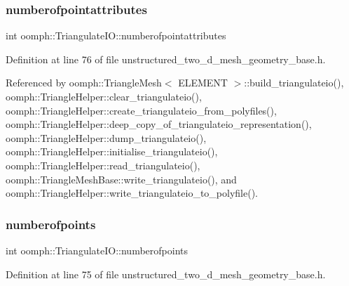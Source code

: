 \mbox{\label{structoomph_1_1TriangulateIO_acfe3391dd2b35a7f04de5935c112678c}} 
\subsubsection{\texorpdfstring{numberofpointattributes}{numberofpointattributes}}
{\footnotesize\ttfamily int oomph\+::\+Triangulate\+I\+O\+::numberofpointattributes}



Definition at line 76 of file unstructured\+\_\+two\+\_\+d\+\_\+mesh\+\_\+geometry\+\_\+base.\+h.



Referenced by oomph\+::\+Triangle\+Mesh$<$ E\+L\+E\+M\+E\+N\+T $>$\+::build\+\_\+triangulateio(), oomph\+::\+Triangle\+Helper\+::clear\+\_\+triangulateio(), oomph\+::\+Triangle\+Helper\+::create\+\_\+triangulateio\+\_\+from\+\_\+polyfiles(), oomph\+::\+Triangle\+Helper\+::deep\+\_\+copy\+\_\+of\+\_\+triangulateio\+\_\+representation(), oomph\+::\+Triangle\+Helper\+::dump\+\_\+triangulateio(), oomph\+::\+Triangle\+Helper\+::initialise\+\_\+triangulateio(), oomph\+::\+Triangle\+Helper\+::read\+\_\+triangulateio(), oomph\+::\+Triangle\+Mesh\+Base\+::write\+\_\+triangulateio(), and oomph\+::\+Triangle\+Helper\+::write\+\_\+triangulateio\+\_\+to\+\_\+polyfile().

\mbox{\label{structoomph_1_1TriangulateIO_a56b30cea17878e957906eed61f53a9c2}} 
\subsubsection{\texorpdfstring{numberofpoints}{numberofpoints}}
{\footnotesize\ttfamily int oomph\+::\+Triangulate\+I\+O\+::numberofpoints}



Definition at line 75 of file unstructured\+\_\+two\+\_\+d\+\_\+mesh\+\_\+geometry\+\_\+base.\+h.



